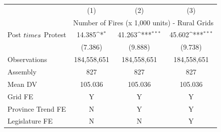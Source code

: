 {
\def\sym#1{\ifmmode^{#1}\else\(^{#1}\)\fi}
\begin{tabular}{l*{3}{c}}
\hline
            &\multicolumn{1}{c}{(1)}         &\multicolumn{1}{c}{(2)}         &\multicolumn{1}{c}{(3)}         \\
            & \multicolumn{3}{c}{Number of Fires (x 1,000 units) - Rural Grids} \\ \hline

Post $\\times$ Protest&      14.385\sym{*}  &      41.263\sym{***}&      45.602\sym{***}\\
            &     (7.386)         &     (9.888)         &     (9.738)         \\
\hline
Observations& 184,558,651         & 184,558,651         & 184,558,651         \\
Assembly    &         827         &         827         &         827         \\
Mean DV     &     105.036         &     105.036         &     105.036         \\
Grid FE     &           Y         &           Y         &           Y         \\
Province Trend FE&           N         &           Y         &           Y         \\
Legislature FE&           N         &           N         &           Y         \\
\hline
\end{tabular}
}

